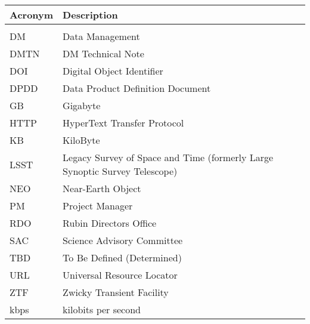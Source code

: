 \addtocounter{table}{-1}
\begin{longtable}{p{}p{}}\hline
\textbf{Acronym} & \textbf{Description}  \\\hline

 &  \\\hline
DM & Data Management \\\hline
DMTN & DM Technical Note \\\hline
DOI & Digital Object Identifier \\\hline
DPDD & Data Product Definition Document \\\hline
GB & Gigabyte \\\hline
HTTP & HyperText Transfer Protocol \\\hline
KB & KiloByte \\\hline
LSST & Legacy Survey of Space and Time (formerly Large Synoptic Survey Telescope) \\\hline
NEO & Near-Earth Object \\\hline
PM & Project Manager \\\hline
RDO & Rubin Directors Office \\\hline
SAC & Science Advisory Committee \\\hline
TBD & To Be Defined (Determined) \\\hline
URL & Universal Resource Locator \\\hline
ZTF & Zwicky Transient Facility \\\hline
kbps & kilobits per second \\\hline
\end{longtable}
